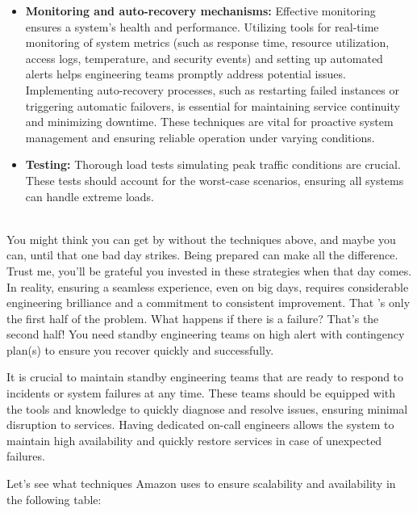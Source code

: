 \begin{itemize}
\item
\protect{}\label{6oAHfhaVSDwW6o7VoNJ0I}
\textbf{Monitoring and auto-recovery mechanisms:} Effective monitoring ensures a system's health and performance. Utilizing tools for real-time monitoring of system metrics (such as response time, resource utilization, access logs, temperature, and security events) and setting up automated alerts helps engineering teams promptly address potential issues. Implementing auto-recovery processes, such as restarting failed instances or triggering automatic failovers, is essential for maintaining service continuity and minimizing downtime. These techniques are vital for proactive system management and ensuring reliable operation under varying conditions.
\item
\protect{}\label{POZvIVy6-StDBvhMH-ooB}
\textbf{Testing:} Thorough load tests simulating peak traffic conditions are crucial. These tests should account for the worst-case scenarios, ensuring all systems can handle extreme loads.
\end{itemize}
\\
You might think you can get by without the techniques above, and maybe you can, until that one bad day strikes. Being prepared can make all the difference. Trust me, you'll be grateful you invested in these strategies when that day comes.
\\
In reality, ensuring a seamless experience, even on big days, requires considerable engineering brilliance and a commitment to consistent improvement. That 's only the first half of the problem. What happens if there is a failure? That's the second half! You need standby engineering teams on high alert with contingency plan(s) to ensure you recover quickly and successfully.

It is crucial to maintain standby engineering teams that are ready to respond to incidents or system failures at any time. These teams should be equipped with the tools and knowledge to quickly diagnose and resolve issues, ensuring minimal disruption to services. Having dedicated on-call engineers allows the system to maintain high availability and quickly restore services in case of unexpected failures.

Let's see what techniques Amazon uses to ensure scalability and availability in the following table:

